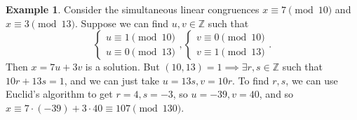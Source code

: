 \documentclass{article}
\theoremstyle{definition}
\newtheorem{example}[theorem]{Example}
\theoremstyle{remark}
\begin{document}
\begin{example}
    Consider the simultaneous linear congruences $x \equiv 7 \pmod{10}$ and $x \equiv 3 \pmod{13}$. Suppose we can find $u,v \in \mathbb{Z}$ such that \[
    \begin{cases}
        u \equiv 1 \pmod{10}\\
        u \equiv 0 \pmod{13}
    \end{cases},
    \begin{cases}
        v \equiv 0 \pmod{10}\\
        v \equiv 1 \pmod{13}
    \end{cases}.
    \]
    Then $x = 7u + 3v$ is a solution. But $(10,13) = 1 \implies \exists r,s \in \mathbb{Z}$ such that $10r+13s = 1$, and we can just take $u = 13s, v = 10r$. To find $r,s$, we can use Euclid's algorithm to get $r=4, s= -3$, so $u = -39, v = 40$, and so $x \equiv 7 \cdot (-39) + 3 \cdot 40 \equiv 107 \pmod{130}$.
\end{example}

\end{document}
